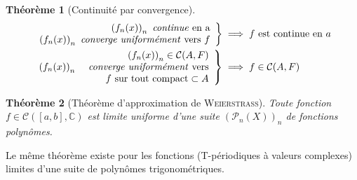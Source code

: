 \documentclass[11pt,a4paper]{report}
\newtheorem{theorem}{Théorème}[chapter]
\theoremstyle{definition}
\begin{document}
\begin{theorem}[Continuité par convergence]

\begin{align*}
\left.
\begin{array}{r}
\left(f_n(x)\right)_{n}\text{ \emph{continue} en a}\\
\left(f_n(x)\right)_n\text{ \emph{converge uniformément} vers }f\\
\end{array}\right\rbrace &\implies f\text{ est continue en }a\\
\left.
\begin{array}{r r}
&\left(f_n(x)\right)_{n}\in\mathcal{C}(A,F)\\
\left(f_n(x)\right)_n&\text{ \emph{converge uniformément} vers}\\
&f \text{ sur tout compact} \subset A\\
\end{array}\right\rbrace &\implies f\in \mathcal{C}(A,F)\\
\end{align*}
\end{theorem}
\begin{theorem}[Théorème d'approximation de \textsc{Weierstrass}]
Toute fonction $f\in \mathcal{C}([a,b],\ensuremath{\mathbb{C}})$ est \emph{limite uniforme} d'une suite $\left(\mathcal{P}_n(X)\right)_n$ de fonctions polynômes.
\end{theorem}
Le même théorème existe pour les fonctions (T-périodiques à valeurs complexes) limites d'une suite de polynômes trigonométriques.
\end{document}
